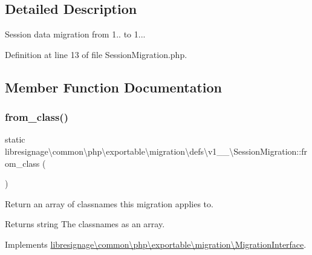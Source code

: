 \subsection{Detailed Description}
Session data migration from 1.. to 1... 

Definition at line 13 of file Session\+Migration.\+php.



\subsection{Member Function Documentation}
\mbox{\label{classlibresignage_1_1common_1_1php_1_1exportable_1_1migration_1_1defs_1_1v1__1__0_1_1SessionMigration_a4dad85abc8be087b615b36aa7b0257bc}} 
\subsubsection{\texorpdfstring{from\+\_\+class()}{from\_class()}}
{\footnotesize\ttfamily static libresignage\textbackslash{}common\textbackslash{}php\textbackslash{}exportable\textbackslash{}migration\textbackslash{}defs\textbackslash{}v1\+\_\+\_\textbackslash{}\+Session\+Migration\+::from\+\_\+class (\begin{DoxyParamCaption}{ }\end{DoxyParamCaption})\hspace{0.3cm}{\ttfamily [static]}}

Return an array of classnames this migration applies to.

\begin{DoxyReturn}{Returns}
string The classnames as an array. 
\end{DoxyReturn}


Implements \hyperlink{interfacelibresignage_1_1common_1_1php_1_1exportable_1_1migration_1_1MigrationInterface_aa8eb2e4ff59358ae551061687540f724}{libresignage\textbackslash{}common\textbackslash{}php\textbackslash{}exportable\textbackslash{}migration\textbackslash{}\+Migration\+Interface}.



